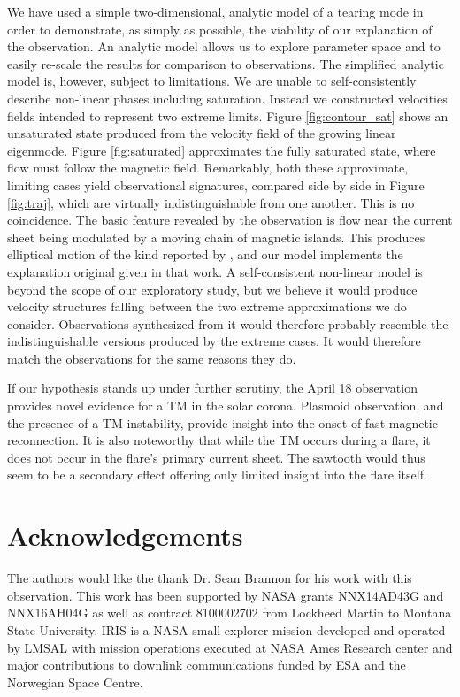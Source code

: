 We have used a simple two-dimensional, analytic model of a tearing mode in order to demonstrate, as simply as possible, the viability of our explanation of the observation.  An analytic model allows us to explore parameter space and to easily re-scale the results for comparison to observations.  The simplified  analytic model is, however, subject to limitations.  We are unable to self-consistently describe non-linear phases including saturation.  Instead we constructed velocities fields intended to represent two extreme limits.  Figure \ref{fig:contour_sat} shows an unsaturated state produced from the velocity field of the growing linear eigenmode.   Figure \ref{fig:saturated} approximates the fully saturated state, where flow must follow the magnetic field.  Remarkably, both these approximate, limiting cases yield observational signatures, compared side by side in Figure \ref{fig:traj}, which are virtually indistinguishable from one another.  This is no coincidence.  The basic feature revealed by the observation is flow near the current sheet being modulated by a moving chain of magnetic islands.  This produces elliptical motion of the kind reported by \BLQ, and our model implements the explanation original given in that work.  A self-consistent non-linear model is beyond the scope of our exploratory study, but we believe it would produce velocity structures falling between the two extreme approximations we do consider.  Observations synthesized from it would therefore probably resemble the indistinguishable versions produced by the extreme cases.  It would therefore match the observations for the same reasons they do.

If our hypothesis stands up under further scrutiny, the April 18 observation provides novel evidence for a TM in the solar corona. Plasmoid observation, and the presence of a TM instability, provide insight into the onset of fast magnetic reconnection.  It is also noteworthy that while the TM occurs during a flare, it does not occur in the flare's primary current sheet.  The sawtooth would thus seem to be a secondary effect offering only limited insight into the flare itself.


\section{Acknowledgements}

The authors would like the thank Dr. Sean Brannon for his work with this observation. This work has been supported by NASA grants NNX14AD43G and NNX16AH04G as well as contract 8100002702 from Lockheed Martin to Montana State University.  IRIS is a NASA small explorer mission developed and operated by LMSAL with mission operations executed at NASA Ames Research center and major contributions to downlink communications funded by ESA and the Norwegian Space Centre.    








